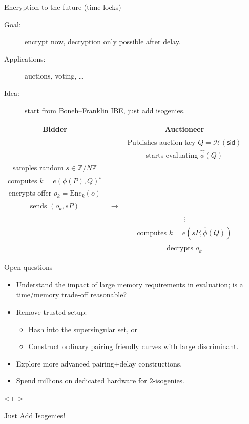 \documentclass[aspectratio=169]{beamer}
\newcommand{\Z}{\mathbb{Z}}
\begin{document}
\begin{frame}{Encryption to the future (time-locks)}
  \begin{description}
  \item[Goal:] encrypt now, decryption only possible after delay.
  \item[Applications:] auctions, voting, \dots
  \item[Idea:] start from Boneh--Franklin IBE, just add
    isogenies\texttrademark.
  \end{description}

  \bigskip
  \centering
  \begin{tabular}{c c c}
    \textbf{Bidder} && \textbf{Auctioneer}\\
                    && Publishes auction key \emph{$Q = \mathcal{H}(\mathsf{sid})$}\\
                    && starts evaluating \emph{$\hat\phi(Q)$}\\
    samples random \emph{$s\in\Z/N\Z$}\\
    computes \emph{$k = e(\phi(P), Q)^s$}\\
    encrypts offer \emph{$o_k = \mathrm{Enc}_{k}(o)$}\\
    \hfill sends \emph{$(o_k,sP)$} & $\longrightarrow$\\
                    && $\vdots$\\
                    && computes \emph{$k = e(sP, \hat\phi(Q))$}\\
                    && decrypts \emph{$o_k$}
  \end{tabular}
\end{frame}


\begin{frame}{Open questions}
  \begin{itemize}
  \item<+-> Understand the impact of large memory requirements in
    evaluation; is a time/memory trade-off reasonable?
  \item<+-> Remove trusted setup:
    \begin{itemize}
    \item Hash into the supersingular set, or
    \item Construct ordinary pairing friendly curves with large
      discriminant.
    \end{itemize}
  \item<+-> Explore more advanced pairing+delay constructions.
  \item<+-> Spend millions on dedicated hardware for $2$-isogenies.
  \end{itemize}

  \bigskip
  \begin{uncoverenv}<+->
    \begin{center}
      \Large Just Add Isogenies\texttrademark!
    \end{center}
  \end{uncoverenv}
\end{frame}
\end{document}

